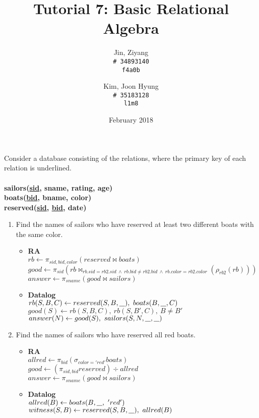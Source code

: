 \documentclass{article}
\title{Tutorial 7: Basic Relational Algebra}
\author{
	Jin, Ziyang\\
	\texttt{\# 34893140}\\
	\texttt{f4a0b}
	\and
	Kim, Joon Hyung\\
	\texttt{\# 35183128}\\
	\texttt{l1m8}
}
\date{February 2018}
\newcommand{\anyvar}{\underline{\hspace{0.8em}}}
\newcommand{\RA}{\textbf{RA}}
\newcommand{\DL}{\textbf{Datalog}}
\begin{document}
	\maketitle

\noindent Consider a database consisting of the relations, where the primary key of each relation is
underlined.\\
\\
\textbf{sailors(\underline{sid}, sname, rating, age)}\\
\textbf{boats(\underline{bid}, bname, color)}\\
\textbf{reserved(\underline{sid}, \underline{bid}, date)}\\

\begin{enumerate}
\item Find the names of sailors who have reserved at least two different boats with the same color.
	\begin{itemize}
	\item \RA\\
	$rb \gets \pi_{sid, bid, color} (reserved \bowtie boats) $\\
	$good \gets \pi_{sid} (rb \bowtie_{rb.sid = rb2.sid\ \land \ rb.bid \neq rb2.bid\ \land \ rb.color = rb2.color} (\rho_{rb2}(rb)) )$\\
	$answer \gets \pi_{sname} (good \bowtie sailors)$
	\item \DL \\
	$ rb(S, B, C) \gets reserved(S, B, \anyvar ),\ boats(B, \anyvar , C) $\\
	$ good(S) \gets rb(S, B, C),\ rb(S, B', C),\ B \neq B' $\\
	$ answer(N) \gets good(S),\ sailors(S, N, \anyvar, \anyvar)$
	\end{itemize}
\item Find the names of sailors who have reserved all red boats.
	\begin{itemize}
	\item \RA \\
	$ allred \gets \pi_{bid} (\sigma_{color = 'red'} boats)$ \\
	$ good \gets (\pi_{sid, bid} reserved) \div allred $\\
	$ answer \gets \pi_{sname}(good \bowtie sailors)$
	\item \DL \\
	$ allred(B) \gets boats(B, \anyvar,\  'red') $\\
	$ witness(S, B) \gets reserved(S, B, \anyvar),\ allred(B) $ \\

\end{itemize}
\end{enumerate}
\end{document}
